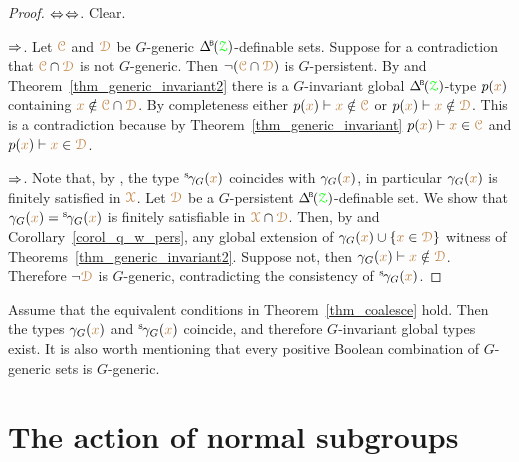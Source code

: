 \begin{proof}
  $\Leftrightarrow$$\Leftrightarrow$. Clear.

  $\Rightarrow$.
  Let ${\color{brown}\EuScript C}$ and ${\color{brown}\EuScript D}$ be $G$-generic $\BDelta({\grZ})$-definable sets.
  Suppose for a contradiction that ${\color{brown}\EuScript C}\cap{\color{brown}\EuScript D}$ is not $G$-generic.
  Then $\neg({\color{brown}\EuScript C}\cap{\color{brown}\EuScript D})$ is $G$-persistent.
  By  and Theorem~\ref{thm_generic_invariant2} there is a $G$-invariant global $\BDelta({\grZ})$-type $p({\color{brown} x})$ containing ${\color{brown} x}\notin{\color{brown}\EuScript C}\cap{\color{brown}\EuScript D}$.
  By completeness either $p({\color{brown} x})\vdash{\color{brown}x}\notin{\color{brown}\EuScript C}$ or $p({\color{brown} x})\vdash{\color{brown}x}\notin{\color{brown}\EuScript D}$.
  This is a contradiction because by Theorem~\ref{thm_generic_invariant} $p({\color{brown} x})\vdash{\color{brown}x}\in{\color{brown}\EuScript C}$ and $p({\color{brown} x})\vdash{\color{brown}x}\in{\color{brown}\EuScript D}$.

  $\Rightarrow$.
  Note that, by , the type ${}^{\rm s}\kern-.2ex\gamma_G({\color{brown} x})$ coincides with $\gamma_G({\color{brown} x})$, in particular $\gamma_G({\color{brown} x})$ is finitely satisfied in ${\color{brown}\EuScript X}$.
  Let ${\color{brown}\EuScript D}$ be a $G$-persistent $\BDelta({\grZ})$-definable set.
  We show that $\gamma_G({\color{brown} x})={}^{\rm s}\kern-.2ex\gamma_G({\color{brown} x})$ is finitely satisfiable in ${\color{brown}\EuScript X}\cap{\color{brown}\EuScript D}$.
  Then, by  and Corollary~\ref{corol_q_w_pers}, any global extension of $\gamma_G({\color{brown} x})\cup\{{\color{brown} x}\in{\color{brown}\EuScript D}\}$ witness  of Theorems~\ref{thm_generic_invariant2}.
  Suppose not, then $\gamma_G({\color{brown} x})\vdash {\color{brown}x}\notin{\color{brown}\EuScript D}$.
  Therefore $\neg{\color{brown}\EuScript D}$ is $G$-generic, contradicting the consistency of ${}^{\rm s}\kern-.2ex\gamma_G({\color{brown} x})$.
\end{proof}


\begin{remark}\label{rem_coalesce} 
  Assume that the equivalent conditions in Theorem~\ref{thm_coalesce} hold.
  Then the types $\gamma_G({\color{brown} x})$ and ${}^{\rm s}\kern-.2ex\gamma_G({\color{brown} x})$ coincide, and therefore $G$-invariant global types exist.
  It is also worth mentioning that every positive Boolean combination of $G$-generic sets is $G$-generic.
\end{remark}


\section{The action of normal subgroups}\label{normalsubgroups}

